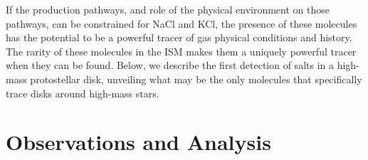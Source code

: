 \documentclass[twocolumn]{aastex62}
\newcommand{\sourcei}{SrcI\xspace}
\newcommand{\bam}[1]{\textcolor{green!65!black}{\textbf{[BAM: #1]}}}
\newcommand{\rlp}[1]{\textcolor{red!65!black}{\textbf{[RLP: #1]}}}
\newcommand{\ag}[1]{\textcolor{red!65!black}{\textbf{[AG: #1]}}}
\begin{document}
If the production pathways, and role of the physical environment on those
pathways, can be constrained for NaCl and KCl, the presence of these molecules
has the potential to be a powerful tracer of gas physical conditions and
history.  The rarity of these molecules in the ISM makes them a uniquely
powerful tracer when they can be found.  Below, we describe the first
detection of salts in a high-mass protostellar disk, unveiling what may
be the only molecules that specifically trace disks around high-mass stars.





\section{Observations and Analysis}

\end{document}
